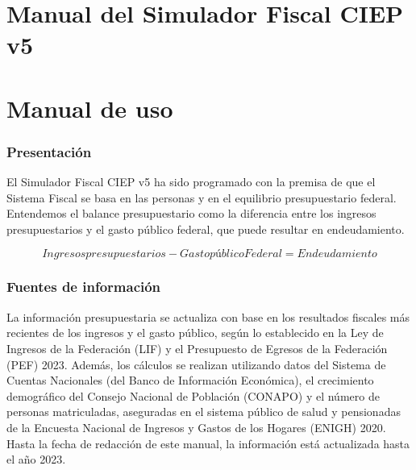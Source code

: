 \gdef\maindoc{1}







\hypertarget{manual-del-simulador-fiscal-ciep-v5}{%
\section{Manual del Simulador Fiscal CIEP
v5}\label{manual-del-simulador-fiscal-ciep-v5}}



\hypertarget{manual-de-uso}{%
\section{Manual de uso}\label{manual-de-uso}}

\hypertarget{presentaciuxf3n}{%
\subsubsection{Presentación}\label{presentaciuxf3n}}

El Simulador Fiscal CIEP v5 ha sido programado con la premisa de que el
Sistema Fiscal se basa en las personas y en el equilibrio presupuestario
federal. Entendemos el balance presupuestario como la diferencia entre
los ingresos presupuestarios y el gasto público federal, que puede
resultar en endeudamiento.

\[Ingresospresupuestarios - GastopúblicoFederal = Endeudamiento\]

\hypertarget{fuentes-de-informaciuxf3n}{%
\subsubsection{Fuentes de información}\label{fuentes-de-informaciuxf3n}}

La información presupuestaria se actualiza con base en los resultados
fiscales más recientes de los ingresos y el gasto público, según lo
establecido en la Ley de Ingresos de la Federación (LIF) y el
Presupuesto de Egresos de la Federación (PEF) 2023. Además, los cálculos
se realizan utilizando datos del Sistema de Cuentas Nacionales (del
Banco de Información Económica), el crecimiento demográfico del Consejo
Nacional de Población (CONAPO) y el número de personas matriculadas,
aseguradas en el sistema público de salud y pensionadas de la Encuesta
Nacional de Ingresos y Gastos de los Hogares (ENIGH) 2020. Hasta la
fecha de redacción de este manual, la información está actualizada hasta
el año 2023.

